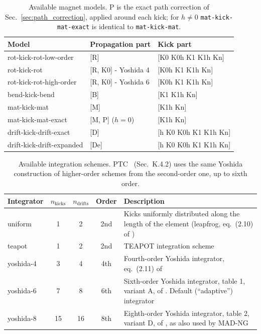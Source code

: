 \begin{table}[t]
\centering
\begin{tabular}{lll}
\toprule
\textbf{Model} & \textbf{Propagation part} & \textbf{Kick part} \\
\midrule
rot-kick-rot-low-order & [R] & [K0 K0h K1 K1h Kn] \\
rot-kick-rot & [R, K0] - Yoshida 4 & [K0h K1 K1h Kn] \\
rot-kick-rot-high-order & [R, K0] - Yoshida 6 & [K0h K1 K1h Kn] \\
bend-kick-bend & [B] & [K1 K1h Kn] \\
mat-kick-mat & [M] & [K1h Kn] \\
mat-kick-mat-exact & [M, P] ($h=0$) & [K1h Kn] \\
drift-kick-drift-exact & [D] & [h K0 K0h K1 K1h Kn] \\
drift-kick-drift-expanded & [De] & [h K0 K0h K1 K1h Kn] \\
\bottomrule
\end{tabular}
\caption{Available magnet models. P is the exact path correction of
Sec.~\ref{sec:path_correction}, applied around each kick; for $h\neq0$
\texttt{mat-kick-mat-exact} is identical to \texttt{mat-kick-mat}.
\label{tab:models}}
\end{table}


\begin{table}[t]
\centering
\begin{tabular}{lcccp{6.5cm}}
\toprule
\textbf{Integrator} & \textbf{$n_\text{kicks}$} & \textbf{$n_\text{drifts}$} & \textbf{Order} & \textbf{Description}\\
\midrule
uniform & 1 & 2 & 2nd &
    Kicks uniformly distributed along the length of the element
    (leapfrog, eq.~(2.10) of \cite{yoshida90}) \\
teapot & 1 & 2 & 2nd &
    TEAPOT integration scheme \cite{Talman:533900, Burkhardt:2013eua} \\
yoshida-4 & 3 & 4 & 4th &
    Fourth-order Yoshida integrator, eq.~(2.11) of \cite{yoshida90} \\
yoshida-6 & 7 & 8 & 6th &
    Sixth-order Yoshida integrator, table 1, variant A, of \cite{yoshida90}.
    Default (``adaptive'') integrator \\
yoshida-8 & 15 & 16 & 8th &
    Eighth-order Yoshida integrator, table 2, variant D, of \cite{yoshida90},
    as also used by MAD-NG \cite{madng_github} \\
\bottomrule
\end{tabular}
\caption{Available integration schemes. PTC~\cite{ptc_report} (Sec.~K.4.2) uses
the same Yoshida construction of higher-order schemes from the second-order one,
up to sixth order. \label{tab:integrators}}
\end{table}

